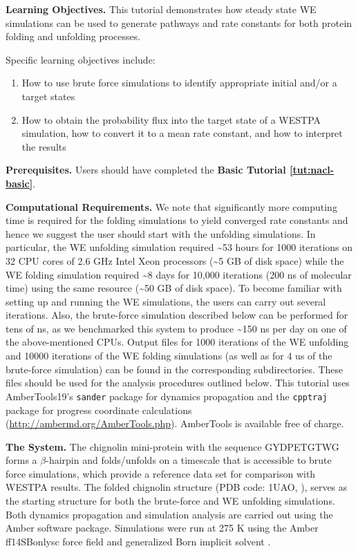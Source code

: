 \textbf{Learning Objectives.} This tutorial demonstrates how steady state WE simulations can be used to generate pathways and rate constants for both protein folding and unfolding processes.  

Specific learning objectives include:
\begin{enumerate}
\item How to use brute force simulations to identify appropriate initial and/or a target states
\item How to obtain the probability flux into the target state of a WESTPA simulation, how to convert it to a mean rate constant, and how to interpret the results
\end{enumerate}

\textbf{Prerequisites.} Users should have completed the \textbf{Basic Tutorial \ref{tut:nacl-basic}}.
 
\textbf{Computational Requirements.} We note that significantly more computing time is required for the folding simulations to yield converged rate constants and hence we suggest the user should start with the unfolding simulations. 
In particular, the WE unfolding simulation required \textasciitilde 53 hours for 1000 iterations on 32 CPU cores of 2.6 GHz Intel Xeon processors (\textasciitilde 5 GB of disk space) while the WE folding simulation required \textasciitilde 8 days for 10,000 iterations (200 ns of molecular time) using the same resource (\textasciitilde 50 GB of disk space).
To become familiar with setting up and running the WE simulations, the users can carry out several iterations.  Also, the brute-force simulation described below can be performed for tens of ns, as we benchmarked this system to produce \textasciitilde 150 ns per day on one of the above-mentioned CPUs. Output files for 1000 iterations of the WE unfolding and 10000 iterations of the WE folding simulations (as well as for 4 us of the brute-force simulation) can be found in the corresponding subdirectories. These files should be used for the analysis procedures outlined below.
This tutorial uses AmberTools19’s \verb|sander| package for dynamics propagation and the  \verb|cpptraj| package for progress coordinate calculations (\url{http://ambermd.org/AmberTools.php}). 
AmberTools is available free of charge.

\textbf{The System.} The chignolin mini-protein with the sequence GYDPETGTWG forms a $\beta$-hairpin and folds/unfolds on a timescale that is accessible to brute force simulations, which provide a reference data set for comparison with WESTPA results. 
The folded chignolin structure (PDB code: 1UAO, \citep{Honda2004}), serves as the starting structure for both the brute-force and WE unfolding simulations. 
Both dynamics propagation and simulation analysis are carried out using the Amber software package. 
Simulations were run at 275 K using the Amber ff14SBonlysc force field \citep{ff} and generalized Born implicit solvent \citep{implicit_solvent}. 

